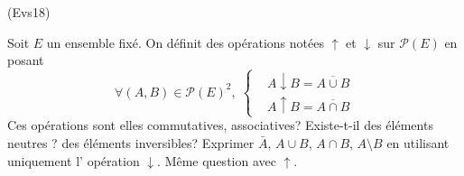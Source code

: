 \begin{tiny}(Evs18)\end{tiny} Soit $E$ un ensemble fixé. On définit des opérations notées $\uparrow$ et $\downarrow$ sur $\mathcal{P}(E)$ en posant
\begin{displaymath}
 \forall (A,B)\in \mathcal{P}(E)^2,\;
\left\lbrace 
\begin{aligned}
 &A \downarrow B = \overline{A\cup B} \\ &A \uparrow B = \overline{A\cap B} 
\end{aligned}
\right. 
\end{displaymath}
Ces opérations sont elles commutatives, associatives? Existe-t-il des éléments neutres ? des éléments inversibles?\newline
Exprimer $\bar{A}$, $A\cup B$, $A\cap B$, $A\setminus B$ en utilisant uniquement l' opération $\downarrow$. Même question avec $\uparrow$.
